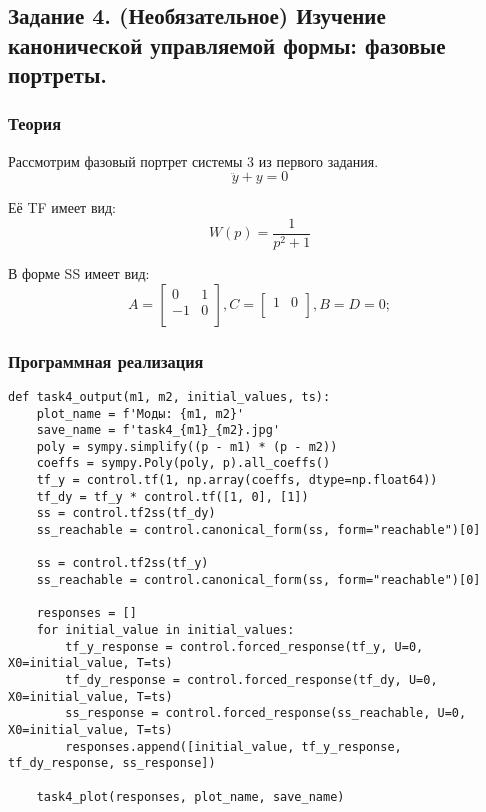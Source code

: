 \documentclass[16pt]{article}
\begin{document}
\newpage
\subsection{Задание 4. (Необязательное) Изучение канонической управляемой формы:
фазовые портреты.}
\subsubsection{Теория}

Рассмотрим фазовый портрет системы 3 из первого задания.
\[\ddot{y} + y = 0\]

Её TF имеет вид:
\[W(p) = \frac{1}{p^2 + 1}\]

В форме SS имеет вид:
\[
    A = \begin{bmatrix}
        0 & 1  \\
        -1 & 0 \\
        \end{bmatrix}, 
    C = \begin{bmatrix}
        1 & 0  \\
        \end{bmatrix},
    B = D = 0; 
\]

\subsubsection{Программная реализация}
\begin{verbatim}
def task4_output(m1, m2, initial_values, ts):
    plot_name = f'Моды: {m1, m2}'
    save_name = f'task4_{m1}_{m2}.jpg'
    poly = sympy.simplify((p - m1) * (p - m2))
    coeffs = sympy.Poly(poly, p).all_coeffs()
    tf_y = control.tf(1, np.array(coeffs, dtype=np.float64))
    tf_dy = tf_y * control.tf([1, 0], [1]) 
    ss = control.tf2ss(tf_dy)
    ss_reachable = control.canonical_form(ss, form="reachable")[0]
    
    ss = control.tf2ss(tf_y)
    ss_reachable = control.canonical_form(ss, form="reachable")[0]

    responses = []
    for initial_value in initial_values:
        tf_y_response = control.forced_response(tf_y, U=0, X0=initial_value, T=ts)
        tf_dy_response = control.forced_response(tf_dy, U=0, X0=initial_value, T=ts)
        ss_response = control.forced_response(ss_reachable, U=0, X0=initial_value, T=ts)
        responses.append([initial_value, tf_y_response, tf_dy_response, ss_response])
    
    task4_plot(responses, plot_name, save_name)
\end{verbatim}
\end{document}
